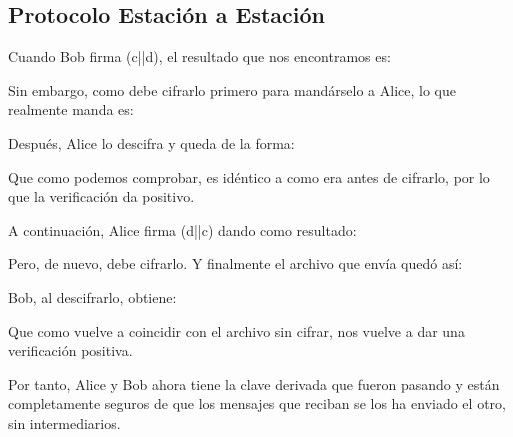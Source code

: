 \documentclass[a4paper, 11pt]{article}
\begin{document}
	\subsection{Protocolo Estación a Estación}
		Cuando Bob firma (c||d), el resultado que nos encontramos es:
		

		Sin embargo, como debe cifrarlo primero para mandárselo a Alice, lo que realmente manda es:
		
		
		Después, Alice lo descifra y queda de la forma:
		
		
		Que como podemos comprobar, es idéntico a como era antes de cifrarlo, por lo que la verificación da positivo.
		
		A continuación, Alice firma (d||c) dando como resultado:
		
		
		Pero, de nuevo, debe cifrarlo. Y finalmente el archivo que envía quedó así:
		
		
		Bob, al descifrarlo, obtiene:
		
		
		Que como vuelve a coincidir con el archivo sin cifrar, nos vuelve a dar una verificación positiva.
		
		Por tanto, Alice y Bob ahora tiene la clave derivada que fueron pasando y están completamente seguros de que los
		mensajes que reciban se los ha enviado el otro, sin intermediarios.
	
\end{document}
